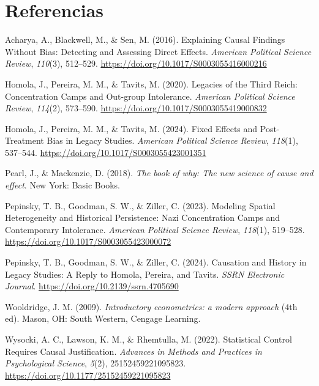 \documentclass[
  12pt,
  a4paper,
]{article}
\newlength{\cslhangindent}
\newlength{\cslentryspacingunit} %
\newenvironment{CSLReferences}[2] %
 {%
  \setlength{\parindent}{0pt}
  \ifodd #1
  \let\oldpar\par
  \def\par{\hangindent=\cslhangindent\oldpar}
  \fi
  \setlength{\parskip}{#2\cslentryspacingunit}
 }%
 {}
\begin{document}
\hypertarget{referencias}{%
\section{Referencias}\label{referencias}}

\hypertarget{refs}{}
\begin{CSLReferences}{1}{0}
\leavevmode{}%
Acharya, A., Blackwell, M., \& Sen, M. (2016). Explaining {Causal Findings Without Bias}: {Detecting} and {Assessing Direct Effects}. \emph{American Political Science Review}, \emph{110}(3), 512--529. \url{https://doi.org/10.1017/S0003055416000216}

\leavevmode{}%
Homola, J., Pereira, M. M., \& Tavits, M. (2020). Legacies of the {Third Reich}: {Concentration Camps} and {Out-group Intolerance}. \emph{American Political Science Review}, \emph{114}(2), 573--590. \url{https://doi.org/10.1017/S0003055419000832}

\leavevmode{}%
Homola, J., Pereira, M. M., \& Tavits, M. (2024). Fixed {Effects} and {Post-Treatment Bias} in {Legacy Studies}. \emph{American Political Science Review}, \emph{118}(1), 537--544. \url{https://doi.org/10.1017/S0003055423001351}

\leavevmode{}%
Pearl, J., \& Mackenzie, D. (2018). \emph{The book of why: The new science of cause and effect}. New York: Basic Books.

\leavevmode{}%
Pepinsky, T. B., Goodman, S. W., \& Ziller, C. (2023). Modeling {Spatial Heterogeneity} and {Historical Persistence}: {Nazi Concentration Camps} and {Contemporary Intolerance}. \emph{American Political Science Review}, \emph{118}(1), 519--528. \url{https://doi.org/10.1017/S0003055423000072}

\leavevmode{}%
Pepinsky, T. B., Goodman, S. W., \& Ziller, C. (2024). Causation and {History} in {Legacy Studies}: {A Reply} to {Homola}, {Pereira}, and {Tavits}. \emph{SSRN Electronic Journal}. \url{https://doi.org/10.2139/ssrn.4705690}

\leavevmode{}%
Wooldridge, J. M. (2009). \emph{{Introductory econometrics: a modern approach}} (4th ed). Mason, OH: South Western, Cengage Learning.

\leavevmode{}%
Wysocki, A. C., Lawson, K. M., \& Rhemtulla, M. (2022). Statistical {Control Requires Causal Justification}. \emph{Advances in Methods and Practices in Psychological Science}, \emph{5}(2), 25152459221095823. \url{https://doi.org/10.1177/25152459221095823}

\end{CSLReferences}
\end{document}
